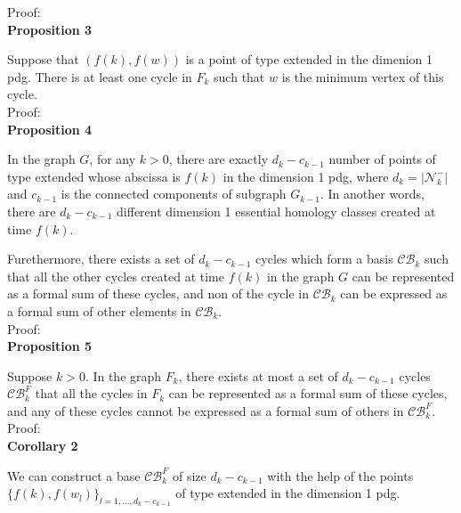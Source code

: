 \documentclass[a4paper,12pt]{article}
\numberwithin{equation}{section}
\begin{document}
	\noindent Proof:\\
	
	
	\noindent \textbf{Proposition 3}
	
	Suppose that $(f(k), f(w))$ is a point of type extended in the dimenion 1 pdg. There is at least one cycle in $F_k$ such that $w$ is the minimum vertex of this cycle.\\
	
	\noindent Proof:\\
	
	\noindent \textbf{Proposition 4}
	
	In the graph $G$, for any $k>0$, there are exactly $d_k - c_{k-1}$ number of points of type extended whose abscissa is $f(k)$ in the dimension 1 pdg, where $d_k = \vert \mathcal{N}^-_{k} \vert$ and $c_{k-1}$ is the connected components of subgraph $G_{k-1}$. In another words, there are $d_k - c_{k-1}$ different dimension 1 essential homology classes created at time $f(k)$.
	
	Furethermore, there exists a set of $d_k - c_{k-1}$ cycles which form a basis $\mathcal{CB}_k$ such that all the other cycles created at time $f(k)$ in the graph $G$ can be represented as a formal sum of these cycles, and non of the cycle in $\mathcal{CB}_k$ can be expressed as a formal sum of other elements in $\mathcal{CB}_k$.\\
	
	\noindent Proof:\\
	
	\noindent \textbf{Proposition 5}
	
	Suppose $k>0$. In the graph $F_k$, there exists at most a set of $d_k - c_{k-1}$ cycles $\mathcal{CB}^{F}_k$ that all the cycles in $F_k$ can be represented as a formal sum of these cycles, and any of these cycles cannot be expressed as a formal sum of others in $\mathcal{CB}^F_k$.\\
	
	\noindent Proof:\\
	
	\noindent \textbf{Corollary 2}
	
	We can construct a base $\mathcal{CB}^F_k$ of size $d_k - c_{k-1}$ with the help of the points $\{f(k), f(w_l)\}_{l =1,\ldots,d_k - c_{k-1}}$ of type extended in the dimension 1 pdg.\\
	
\end{document}
